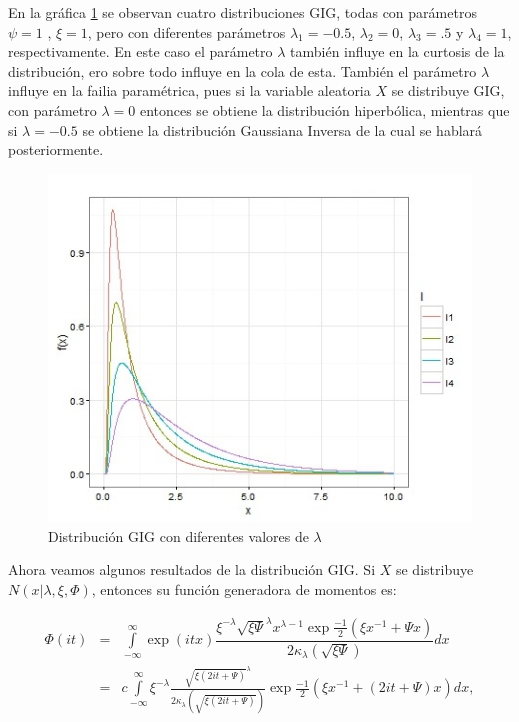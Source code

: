 En la gráfica \ref{fig:gigdiferentesvaloreslambda} se observan cuatro distribuciones GIG, todas con parámetros $\psi=1$ , $\xi=1$, pero con diferentes parámetros $\lambda_{1}=-0.5$, $\lambda_{2}=0$, $\lambda_{3}=.5$ y $\lambda_{4}=1$, respectivamente. En este caso el parámetro $\lambda$ también influye en la curtosis de la distribución, ero sobre todo influye en la cola de esta. También el parámetro $\lambda$ influye en la failia paramétrica, pues si la variable aleatoria $X$ se distribuye GIG, con parámetro $\lambda=0$ entonces se obtiene la distribución hiperbólica, mientras que si $\lambda=-0.5$ se obtiene la distribución Gaussiana Inversa de la cual se hablará posteriormente. 

\newpage 
\begin{figure}[ht]
	\centering
	\includegraphics[width=0.8\linewidth]{Figuras/gigdiferentesvaloreslambda}
	\caption{Distribución GIG con diferentes valores de $\lambda$}
	\label{fig:gigdiferentesvaloreslambda}
\end{figure}


Ahora veamos algunos resultados de la distribución GIG. Si $X$ se distribuye $N\tilde{}(x|\lambda,\xi,\Phi)$, entonces su función generadora de momentos es:

\begin{eqnarray*}
\Phi (it) & = &\underset{-\infty }{\overset{\infty }{\int }}\exp(itx){\dfrac{\xi^{-\lambda}\sqrt{\xi\Psi}^{\lambda}x^{\lambda-1}\exp{\frac{-1}{2}(\xi x^{-1} + \Psi x)}}{2\kappa_{\lambda}(\sqrt{\xi\Psi})}}dx\\
 &=& c\underset{-\infty }{\overset{\infty }{\int }}\xi^{-\lambda}\frac{\sqrt{\xi(2it + \Psi)}^{\lambda}}{2\kappa_{\lambda}(\sqrt{\xi(2it + \Psi)})}\exp{\frac{-1}{2}(\xi x^{-1} + (2it+\Psi) x)}dx,\\ 
\end{eqnarray*}

